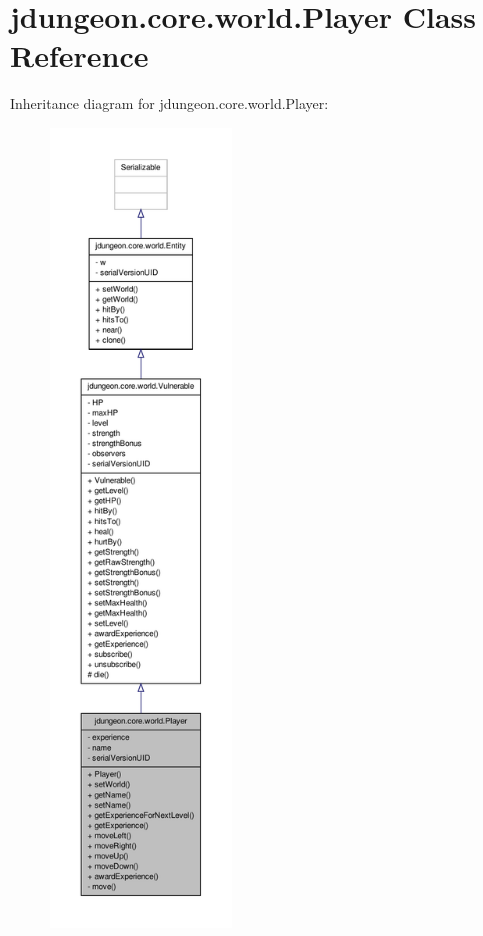 \hypertarget{classjdungeon_1_1core_1_1world_1_1_player}{
\section{jdungeon.core.world.Player Class Reference}
\label{classjdungeon_1_1core_1_1world_1_1_player}
}


Inheritance diagram for jdungeon.core.world.Player:
\nopagebreak
\begin{figure}[H]
\begin{center}
\leavevmode
\includegraphics[height=600pt]{classjdungeon_1_1core_1_1world_1_1_player__inherit__graph}
\end{center}
\end{figure}


